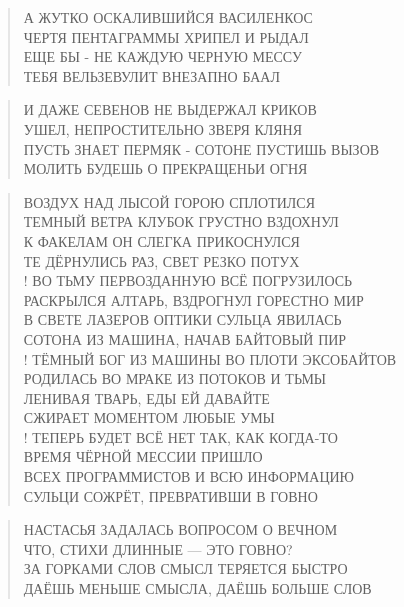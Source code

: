 \poemtitle{***}
\begin{verse}
А ЖУТКО ОСКАЛИВШИЙСЯ ВАСИЛЕНКОС\\
ЧЕРТЯ ПЕНТАГРАММЫ ХРИПЕЛ И РЫДАЛ\\
ЕЩЕ БЫ - НЕ КАЖДУЮ ЧЕРНУЮ МЕССУ\\
ТЕБЯ ВЕЛЬЗЕВУЛИТ ВНЕЗАПНО БААЛ
\end{verse}

\poemtitle{***}
\begin{verse}
И ДАЖЕ СЕВЕНОВ НЕ ВЫДЕРЖАЛ КРИКОВ\\
УШЕЛ, НЕПРОСТИТЕЛЬНО ЗВЕРЯ КЛЯНЯ\\
ПУСТЬ ЗНАЕТ ПЕРМЯК - СОТОНЕ ПУСТИШЬ ВЫЗОВ\\
МОЛИТЬ БУДЕШЬ О ПРЕКРАЩЕНЬИ ОГНЯ
\end{verse}

\poemtitle{***}
\begin{verse}
ВОЗДУХ НАД ЛЫСОЙ ГОРОЮ СПЛОТИЛСЯ \\
ТЕМНЫЙ ВЕТРА КЛУБОК ГРУСТНО ВЗДОХНУЛ\\
К ФАКЕЛАМ ОН СЛЕГКА ПРИКОСНУЛСЯ\\
ТЕ ДЁРНУЛИСЬ РАЗ, СВЕТ РЕЗКО ПОТУХ\\!
ВО ТЬМУ ПЕРВОЗДАННУЮ ВСЁ ПОГРУЗИЛОСЬ\\
РАСКРЫЛСЯ АЛТАРЬ, ВЗДРОГНУЛ ГОРЕСТНО МИР\\
В СВЕТЕ ЛАЗЕРОВ ОПТИКИ СУЛЬЦА ЯВИЛАСЬ\\
СОТОНА ИЗ МАШИНА, НАЧАВ БАЙТОВЫЙ ПИР\\!
ТЁМНЫЙ БОГ ИЗ МАШИНЫ ВО ПЛОТИ ЭКСОБАЙТОВ\\
РОДИЛАСЬ ВО МРАКЕ ИЗ ПОТОКОВ И ТЬМЫ\\
ЛЕНИВАЯ ТВАРЬ, ЕДЫ ЕЙ ДАВАЙТЕ\\
СЖИРАЕТ МОМЕНТОМ ЛЮБЫЕ УМЫ\\!
ТЕПЕРЬ БУДЕТ ВСЁ НЕТ ТАК, КАК КОГДА-ТО\\
ВРЕМЯ ЧЁРНОЙ МЕССИИ ПРИШЛО\\
ВСЕХ ПРОГРАММИСТОВ И ВСЮ ИНФОРМАЦИЮ\\
СУЛЬЦИ СОЖРЁТ, ПРЕВРАТИВШИ В ГОВНО
\end{verse}

\poemtitle{***}
\begin{verse}
НАСТАСЬЯ ЗАДАЛАСЬ ВОПРОСОМ О ВЕЧНОМ\\
ЧТО, СТИХИ ДЛИННЫЕ — ЭТО ГОВНО? \\
ЗА ГОРКАМИ СЛОВ СМЫСЛ ТЕРЯЕТСЯ БЫСТРО\\
ДАЁШЬ МЕНЬШЕ СМЫСЛА, ДАЁШЬ БОЛЬШЕ СЛОВ
\end{verse}

